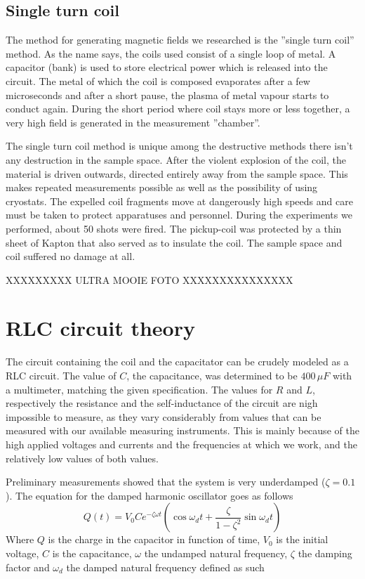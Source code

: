 \subsection{Single turn coil}

The method for generating magnetic fields we researched is the ''single turn 
coil'' method. As the name says, the coils used consist of a single loop of 
metal. A capacitor (bank) is used to store electrical power which is released 
into the circuit. The metal of which the coil is composed evaporates after a 
few microseconds and after a short pause, the plasma of metal vapour starts to 
conduct again. During the short period where coil stays more or less together, 
a very high field is generated in the measurement ''chamber''. 

The single turn coil method is unique among the destructive methods there isn't 
any destruction in the sample space. After the violent explosion of the coil, 
the material is driven outwards, directed entirely away from the sample space.  
This makes repeated measurements possible as well as the possibility of using 
cryostats. The expelled coil fragments move at dangerously high speeds and care 
must be taken to protect apparatuses and personnel. \cite{singleTurn} 
\cite{herlachArticle} During the experiments we performed, about 50 shots were 
fired. The pickup-coil was protected by a thin sheet of Kapton that also served 
as to insulate the coil. The sample space and coil suffered no damage at all.


XXXXXXXXX ULTRA MOOIE FOTO XXXXXXXXXXXXXXX

\section{RLC circuit theory}

The circuit containing the coil and the capacitator can be crudely modeled as a 
RLC circuit. The value of $C$, the capacitance, was determined to be $400\,\mu 
F$ with a multimeter, matching the given specification. The values for $R$ and 
$L$, respectively the resistance and the self-inductance of the circuit are 
nigh impossible to measure, as they vary considerably from values that can be 
measured with our available measuring instruments. This is mainly because of 
the high applied voltages and currents and the frequencies at which we work, 
and the relatively low values of both values.

Preliminary measurements showed that the system is very underdamped ($\zeta = 
0.1$). The equation for the damped harmonic oscillator goes as follows 
\cite{serway}
$$
Q(t) = V_0 C e^{-\zeta \omega t} \left( \cos{\omega_d t} + \frac{\zeta} 
{1-\zeta^2} \sin{\omega_d t}\right)
$$
Where $Q$ is the charge in the capacitor in function of time, $V_0$ is the 
initial voltage, $C$ is the capacitance, $\omega$ the undamped natural 
frequency, $\zeta$ the damping factor and $\omega_d$ the damped natural 
frequency defined as such

